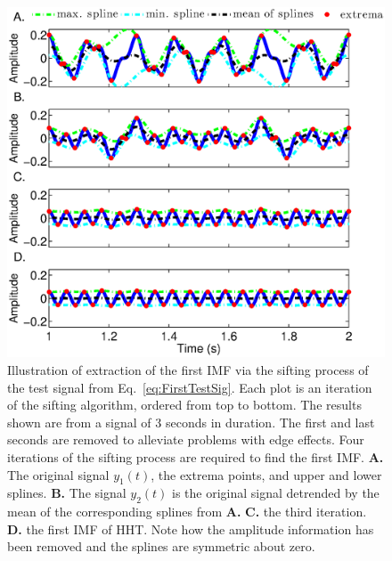 \documentclass[a4paper]{IEEEtran}
\begin{document}
\begin{figure}
\begin{center}
 \includegraphics[scale=0.42]{./Figures/HHTDemo.eps}
 \caption[HHTDemo]{Illustration of extraction of the first IMF via the sifting process of the test signal from Eq.~\ref{eq:FirstTestSig}. Each plot is an iteration of the sifting algorithm, ordered from top to bottom. The results shown are from a signal of 3 seconds in duration. The first and last seconds are removed to alleviate problems with edge effects. Four iterations of the sifting process are required to find the first IMF. \textbf{A.} The original signal $y_1(t)$, the extrema points, and upper and lower splines. \textbf{B.} The signal $y_2(t)$ is the original signal detrended by the mean of the corresponding splines from \textbf{A.} \textbf{C.} the third iteration. \textbf{D.} the first IMF of HHT. Note how the amplitude information has been removed and the splines are symmetric about zero.}
\label{fig:HHTDemo}
\end{center}
\end{figure}
\end{document}
